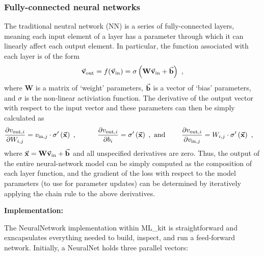 \subsubsection{Fully-connected neural networks}
The traditional neutral network (NN) is a series of fully-connected layers, meaning each input element of a layer has a parameter through which it can linearly affect each output element.
In particular, the function associated with each layer is of the form \textcolor{blue}{\autocite{Nielsen_2015}}
\begin{equation*}
  \begin{aligned}
    \vec{\mathbf{v}}_{\text{out}} = f(\vec{\mathbf{v}}_{\text{in}}) = \sigma\left(\mathbf{W}\vec{\mathbf{v}}_{\text{in}} + \vec{\mathbf{b}}\right) ~,
  \end{aligned}
\end{equation*}
where $\mathbf{W}$ is a matrix of `weight' parameters, $\vec{\mathbf{b}}$ is a vector of `bias' parameters, and $\sigma$ is the non-linear activiation function.
The derivative of the output vector with respect to the input vector and these parameters can then be simply calculated as
\begin{equation*}
  \begin{aligned}
    \frac{\partial v_{\text{out}, i}}{\partial W_{i, j}} = v_{\text{in}, j} \cdot \sigma'\left(\vec{\mathbf{x}}\right)\hspace{3pt}, \hspace{30pt} \frac{\partial v_{\text{out}, i}}{\partial b_{i}} & = \sigma'\left(\vec{\mathbf{x}}\right)\hspace{3pt},\text{ and} \hspace{23pt} \frac{\partial v_{\text{out}, i}}{\partial v_{\text{in}, j}} = W_{i, j} \cdot \sigma'\left(\vec{\mathbf{x}}\right) ~,
  \end{aligned}
\end{equation*}
where $\vec{\mathbf{x}} = \mathbf{W}\vec{\mathbf{v}}_{\text{in}} + \vec{\mathbf{b}}$ and all unspecified derivatives are zero.
Thus, the output of the entire neural-network model can be simply computed as the composition of each layer function, and the gradient of the loss with respect to the model parameters (to use for parameter updates) can be determined by iteratively applying the chain rule to the above derivatives.

\begin{center}
 \textbf{Implementation:}
\end{center}

The NeuralNetwork implementation within ML_kit is straightforward and exncapsulates everything needed to build, inspect, and run a feed-forward network.
Initially, a NeuralNet holds three parallel vectors: 

